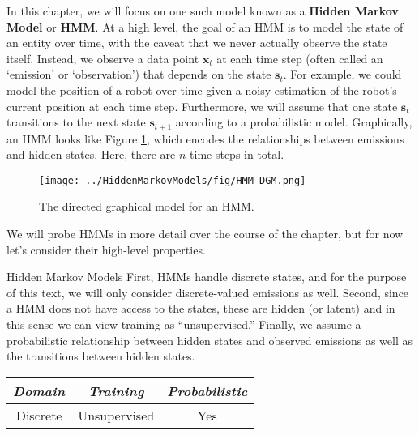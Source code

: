 
In this chapter, we will focus on one such model known as a \textbf{Hidden Markov Model} or \textbf{HMM}. At a high level, the goal of an HMM is to model the state of an entity over time, with the caveat that we never actually observe the state itself. Instead, we observe a data point $\textbf{x}_t$ at each time step (often called an `emission' or `observation') that depends on
the state $\textbf{s}_t$. For example, we could model the position of a robot over time given a noisy estimation of the robot's current position at each time step. Furthermore, we will assume that one state $\textbf{s}_t$ transitions to the next state $\textbf{s}_{t+1}$ according to a probabilistic model. Graphically, an HMM looks like Figure \ref{fig:HMM-DGM}, which encodes the relationships between emissions and hidden states.  Here, there are $n$ time steps in total.
%
\begin{figure}
    \centering
    \texttt{[image: ../HiddenMarkovModels/fig/HMM\_DGM.png]}
    \caption{The directed graphical model for an HMM.}
    \label{fig:HMM-DGM}
\end{figure}

We will probe HMMs in more detail over the course of the chapter, but for now let's consider their high-level properties.

\begin{mlcube}{Hidden Markov Models}
First, HMMs handle discrete states, and for the purpose of this text, we will only consider discrete-valued emissions as well. Second, since a HMM does not have access to the states, these are hidden (or latent) and in this sense we can view training as ``unsupervised.'' Finally, we assume a probabilistic relationship between hidden states and observed emissions as well as the transitions between hidden states.
\begin{center}
    \begin{tabular}{c|c|c}
    \textit{\textbf{Domain}} & \textit{\textbf{Training}} & \textit{\textbf{Probabilistic}} \\
    \hline
    Discrete & Unsupervised & Yes \\
    \end{tabular}
\end{center}
\end{mlcube}

